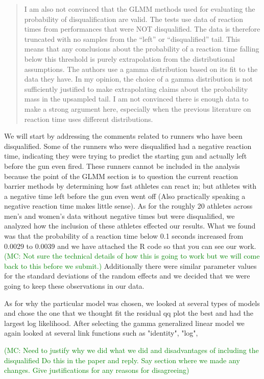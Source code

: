 \documentclass[12pt]{article}
\newcommand{\of}[1]{\textcolor{green}{(MC: #1)}}
\newenvironment{comment}%
{\begin{quotation}\noindent\small\it\color{darkblue}\ignorespaces%
}{\end{quotation}}
\begin{document}
\begin{comment}
I am also not convinced that the GLMM methods used for evaluating the
probability of disqualification are valid. The tests use data of reaction times
from performances that were NOT disqualified.  The data is therefore truncated
with no samples from the “left” or “disqualified” tail. This means that any
conclusions about the probability of a reaction time falling below this
threshold is purely extrapolation from the distributional assumptions. The
authors use a gamma distribution based on its fit to the data they have. In my
opinion, the choice of a gamma distribution is not sufficiently justified to
make extrapolating claims about the probability mass in the upsampled tail. I am
not convinced there is enough data to make a strong argument here, especially
when the previous literature on reaction time uses different distributions.
\end{comment}
We will start by addressing the comments related to runners who have been
disqualified.  Some of the runners who were disqualified had a negative reaction
time, indicating they were trying to predict the starting gun and actually left
before the gun even fired.  These runners cannot be included in the analysis
because the point of the GLMM section is to question the current reaction barrier
methods by determining how fast athletes can react in; but athletes with a
negative time left before the gun even went off (Also practically speaking
a negative reaction time makes little sense).  As for the roughly 20 athletes
across men's and women's data without negative times but were disqualified, we
analyzed how the inclusion of these athletes effected our results.  What we found
was that the probability of a reaction time below 0.1 seconds increased from
0.0029 to 0.0039 and we have attached the R code so that you can see our work.
\of{Not sure the technical details of how this is going to work but we will come
back to this before we submit.} Additionally there were similar parameter values
for the standard deviations of the random effects and we decided that we were
going to keep these observations in our data.

As for why the particular model was
chosen, we looked at several types of models and chose the one that we thought
fit the residual qq plot the best and had the largest log likelihood. After
selecting the gamma generalized linear model we again looked at several link
functions such as "identity", "log",

\of{Need to justify why we did what we did and disadvantages of including the
disqualified
Do this in the paper and reply. Say section where we made any changes. Give
justifications for any reasons for disagreeing}
\end{document}

